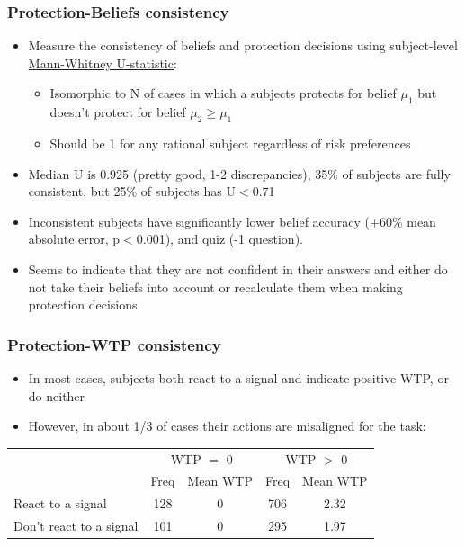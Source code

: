 \documentclass[11pt,hyperref={bookmarks=false}]{beamer}
\begin{document}
\begin{frame}
\frametitle{Protection-Beliefs consistency}

\begin{itemize}
\item Measure the consistency of beliefs and protection decisions using subject-level \href{https://en.wikipedia.org/wiki/Mann-Whitney_U_test}{Mann-Whitney U-statistic}:
\begin{itemize}
\item Isomorphic to N of cases in which a subjects protects for belief $\mu_1$ but doesn't protect for belief $\mu_2\geq \mu_1$
\item Should be 1 for any rational subject regardless of risk preferences
\end{itemize}
\item Median U is 0.925 (pretty good, 1-2 discrepancies), 35\% of subjects are fully consistent, but 25\% of subjects has U$<$0.71
\item Inconsistent subjects have significantly lower belief accuracy (+60\% mean absolute error, p$<$0.001), and quiz (-1 question).
\item Seems to indicate that they are not confident in their answers and either do not take their beliefs into account or recalculate them when making protection decisions
\end{itemize}

\end{frame}





\begin{frame}
\frametitle{Protection-WTP consistency}

\begin{itemize}
\item In most cases, subjects both react to a signal and indicate positive WTP, or do neither
\item However, in about 1/3 of cases their actions are misaligned for the task:
\end{itemize}
%
\begin{tabular}{lcccc}
\toprule
 & \multicolumn{2}{c}{WTP $=$ 0} & \multicolumn{2}{c}{WTP $>$ 0} \\
 & Freq & Mean WTP & Freq & Mean WTP \\ 
\midrule
React to a signal&128&0&706&2.32\\
Don't react to a signal&101&0&295&1.97\\
\bottomrule
\end{tabular}
\end{frame}
\end{document}
